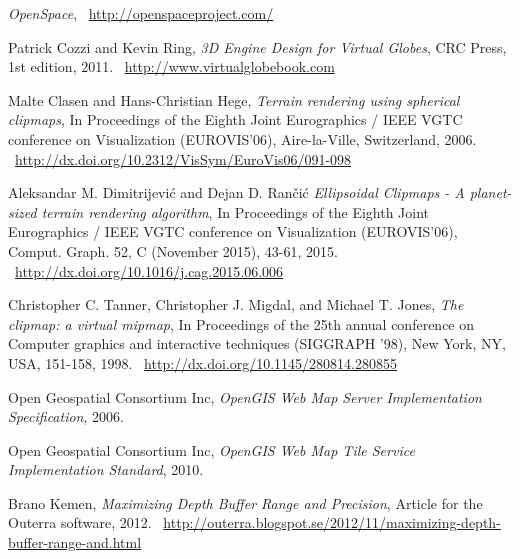 \cleardoublepage
{}
{}
\begin{thebibliography}{99}



  \emph{OpenSpace},
   \
  \url{http://openspaceproject.com/}

  Patrick Cozzi and Kevin Ring,
  \emph{3D Engine Design for Virtual Globes},
  CRC Press,
  1st edition,
  2011. \
  \url{http://www.virtualglobebook.com}

  Malte Clasen and Hans-Christian Hege,
  \emph{Terrain rendering using spherical clipmaps},
  In Proceedings of the Eighth Joint Eurographics / IEEE VGTC conference on Visualization (EUROVIS'06),
  Aire-la-Ville, Switzerland,
  2006. \
  \url{http://dx.doi.org/10.2312/VisSym/EuroVis06/091-098}

  Aleksandar M. Dimitrijevi\'{c} and Dejan D. Ran\v{c}i\'{c}
  \emph{Ellipsoidal Clipmaps - A planet-sized terrain rendering algorithm},
  In Proceedings of the Eighth Joint Eurographics / IEEE VGTC conference on Visualization (EUROVIS'06),
  Comput. Graph. 52, C (November 2015), 43-61,
  2015. \
  \url{http://dx.doi.org/10.1016/j.cag.2015.06.006}

\bibitem{tanner98}
  Christopher C. Tanner, Christopher J. Migdal, and Michael T. Jones,
  \emph{The clipmap: a virtual mipmap},
  In Proceedings of the 25th annual conference on Computer graphics and interactive techniques (SIGGRAPH '98),
  New York, NY, USA, 151-158,
  1998. \
  \url{http://dx.doi.org/10.1145/280814.280855}

\bibitem{wms06}
  Open Geospatial Consortium Inc,
  \emph{OpenGIS Web Map Server Implementation Specification},
  2006.

\bibitem{wmts10}
  Open Geospatial Consortium Inc,
  \emph{OpenGIS Web Map Tile Service Implementation Standard},
  2010.

\bibitem{kemen12}
  Brano Kemen,
  \emph{Maximizing Depth Buffer Range and Precision},
  Article for the Outerra software,
  2012. \
  \url{http://outerra.blogspot.se/2012/11/maximizing-depth-buffer-range-and.html}


\end{thebibliography}
